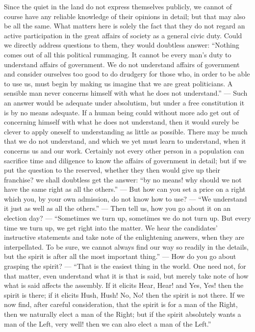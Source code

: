 \documentclass[12pt,a4paper,openany]{book}
\newcommand{\opage}[1]{\marginnote{\footnotesize\textit{[#1]}}}
\begin{document}
Since the quiet in the land do not express themselves publicly,
we cannot of course have any reliable
knowledge of their opinions in detail; but that
may also be all the same. What matters here
is solely the fact that they do not regard
an active participation in the great affairs of society
as a general civic duty. Could we directly address
questions to them, they would doubtless answer:
``Nothing comes out of all this political rummaging.
It cannot be every man's duty to understand
affairs of government. We do not understand
affairs of government and consider ourselves too good to do
drudgery for those who, in order to be able to use us,
must begin by making us imagine that we are great
politicians. A sensible man never concerns himself with
what he does not understand.'' --- Such an answer would be
adequate under absolutism, but under a free
constitution it is by no means adequate. If
a human being could without more ado get out of concerning
himself with what he does not understand, then it would surely be
clever to apply oneself to understanding as little as
possible. There may be much that we do not understand, and which
we yet must learn to understand, when it concerns us
and our work. Certainly not every other person in
\setcounter{footnote}{0}%
\opage{65}a population can sacrifice time and diligence to know
the affairs of government in detail; but if we put the
question to the reserved, whether they then would give up
their franchise? we shall doubtless get the answer: ``by no
means! why should we not have the same right as
all the others.'' --- But how can you set a price
on a right which you, by your own admission,
do not know how to use? --- ``We understand it just as well
as all the others.'' --- Then tell us, how you
go about it on an election day? --- ``Sometimes we turn up,
sometimes we do not turn up. But every time we turn up,
we get right into the matter. We hear the candidates'
instructive statements and take note of the enlightening answers,
when they are interpellated. To be sure, we cannot always
find our way so readily in the details, but the spirit is after all
the most important thing.'' --- How do you go about
grasping the spirit? --- ``That is the easiest thing
in the world. One need not, for that matter, even
understand what it is that is said, but merely take
note of how what is said affects the assembly.
If it elicits Hear, Hear! and Yes, Yes! then the spirit is there;
if it elicits Hush, Hush! No, No! then the spirit is not there.
If we now find, after careful consideration, that the spirit
is for a man of the Right, then we naturally elect a man of the Right;
but if the spirit absolutely wants a man of the Left,
very well! then we can also elect a man of the Left.''
\end{document}
